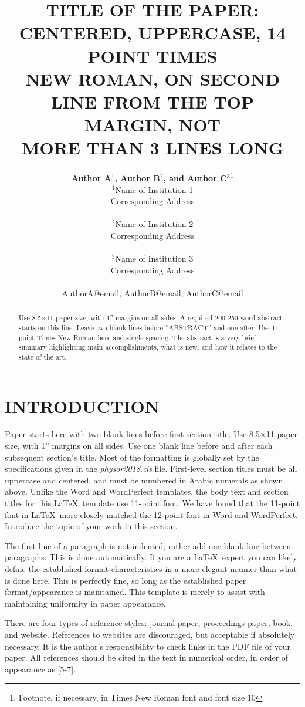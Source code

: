 \documentclass[letterpaper]{physor2018}
\title{TITLE OF THE PAPER: CENTERED, UPPERCASE, 14 POINT TIMES \\
  NEW ROMAN, ON SECOND LINE FROM THE TOP MARGIN, NOT \\
  MORE THAN 3 LINES LONG}
\author{%
  \textbf{Author A$^1$, Author B$^2$, and Author C$^3$}\footnote{Footnote, if necessary, in Times New Roman font and font size 10} \\
  $^1$Name of Institution 1  \\
  Corresponding Address \\ 
\\
  $^2$Name of Institution 2  \\ 
    Corresponding Address \\ 
\\
  $^3$Name of Institution 3  \\
     Corresponding Address \\
     \\
  \url{AuthorA@email}, \url{AuthorB@email}, \url{AuthorC@email}
}
\begin{document}
\maketitle
\justify 

\begin{abstract}
  Use 8.5$\times$11 paper size, with 1'' margins on all sides.  A required 200-250 
  word abstract starts on this line.  Leave two blank lines before ``ABSTRACT''
  and one after.  Use 11 point Times New Roman here and single 
  spacing. The abstract is a very brief summary highlighting main 
  accomplishments, what is new, and how it relates to the state-of-the-art.
\end{abstract}

\section{INTRODUCTION} 
Paper starts here with two blank lines before first section title.  Use 
8.5$\times$11 paper size, with 1'' margins on all sides.  Use one blank line 
before and after each subsequent section’s title.  Most of the formatting is globally
set by the specifications given in the \emph{physor2018.cls} file.  
First-level section titles must be all uppercase and centered, and must 
be numbered in Arabic numerals as shown above.  Unlike the Word and WordPerfect
templates, the body text and section titles for this \LaTeX\ template use 
11-point font.  We have found that the 11-point font in \LaTeX\ more closely 
matched the 12-point font in Word and WordPerfect.  Introduce the topic of your work 
in this section.

The first line of a paragraph is not indented; rather add one blank line between 
paragraphs.  This is done automatically. If you are a \LaTeX\ expert you 
can likely define the established format characteristics in a more elegant 
manner than what is done here.  This is perfectly fine, so long as the 
established paper format/appearance is maintained.  This template is merely 
to assist with maintaining uniformity in paper appearance.

There are four types of reference styles: journal paper\cite{journal}, 
proceedings paper\cite{proc_paper}, book\cite{book}, and website\cite{website}.
References to websites are discouraged, but acceptable if absolutely necessary. It 
is the author’s responsibility to check links in the PDF file of your paper. 
All references should be cited in the text in numerical order, in order of 
appearance as [5-7].
\end{document}
